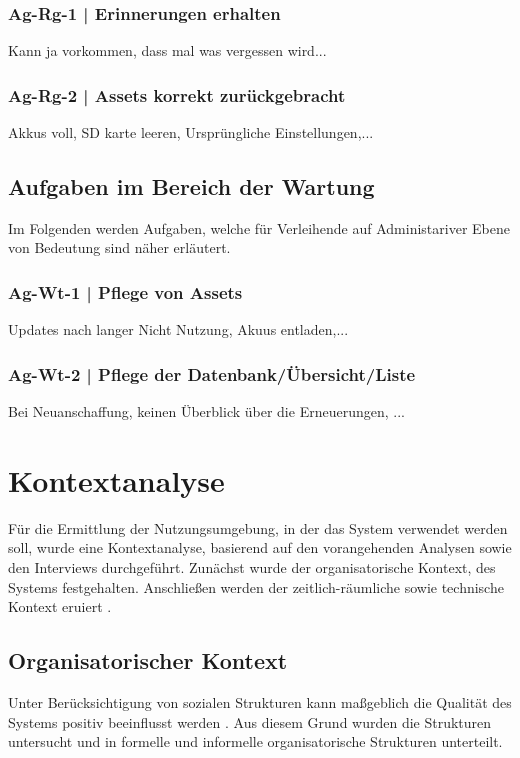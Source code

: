 \subsubsection{Ag-Rg-1 | Erinnerungen erhalten}
Kann ja vorkommen, dass mal was vergessen wird...
\subsubsection{Ag-Rg-2 | Assets korrekt zurückgebracht}
Akkus voll, SD karte leeren, Ursprüngliche Einstellungen,...

\subsection{Aufgaben im Bereich der Wartung}
\label{subsec:wartung}
Im Folgenden werden Aufgaben, welche für Verleihende auf Administariver Ebene von Bedeutung sind
näher erläutert. 

\subsubsection{Ag-Wt-1 | Pflege von Assets}
\label{subsubsection:Ag-Wt-1}
Updates nach langer Nicht Nutzung, Akuus entladen,...

\subsubsection{Ag-Wt-2 | Pflege der Datenbank/Übersicht/Liste}
\label{subsubsection:Ag-Wt-2}
Bei Neuanschaffung, keinen Überblick über die Erneuerungen, ...



\section{Kontextanalyse}
\label{section:kontext}

Für die Ermittlung der Nutzungsumgebung, in der das System verwendet werden soll, wurde eine
Kontextanalyse, basierend auf den vorangehenden Analysen sowie den Interviews durchgeführt. Zunächst
wurde der organisatorische Kontext, des Systems festgehalten. Anschließen werden der
zeitlich-räumliche sowie technische Kontext eruiert \cite{herczeg_einfuhrung_2009}.

\subsection{Organisatorischer Kontext}
Unter Berücksichtigung von sozialen Strukturen kann maßgeblich die Qualität des Systems positiv
beeinflusst werden \cite{herczeg_einfuhrung_2009}. Aus diesem Grund wurden die Strukturen untersucht
und in formelle und informelle organisatorische Strukturen unterteilt.


